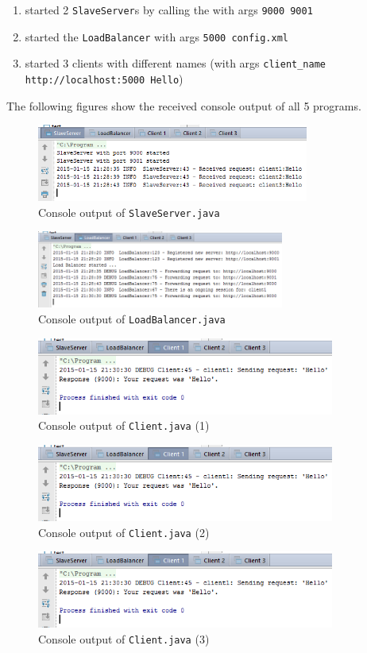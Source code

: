 \documentclass[11pt, a4paper]{article}
\begin{document}
\begin{enumerate}
	\item started 2 \lstinline|SlaveServer|s by calling the with args \lstinline|9000 9001|
	\item started the \lstinline|LoadBalancer| with args \lstinline|5000 config.xml|
	\item started 3 clients with different names (with args \lstinline|client_name http://localhost:5000 Hello|)
\end{enumerate}

The following figures show the received console output of all 5 programs.

\begin{figure}[H]
	\centering
	\includegraphics[height=1in]{img/test-servers}
	\caption{Console output of \lstinline|SlaveServer.java|}
\end{figure}
\begin{figure}[H]
	\centering
	\includegraphics[height=1in]{img/test-loadbalancer}
	\caption{Console output of \lstinline|LoadBalancer.java|}
\end{figure}
\begin{figure}[H]
	\centering
	\includegraphics[height=1in]{img/test-client1}
	\caption{Console output of \lstinline|Client.java| (1)}
\end{figure}
\begin{figure}[H]
	\centering
	\includegraphics[height=1in]{img/test-client1}
	\caption{Console output of \lstinline|Client.java| (2)}
\end{figure}
\begin{figure}[H]
	\centering
	\includegraphics[height=1in]{img/test-client1}
	\caption{Console output of \lstinline|Client.java| (3)}
\end{figure}
\end{document}
